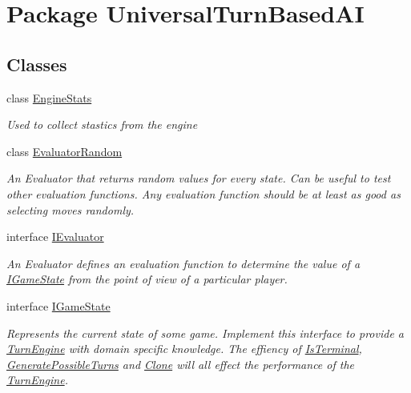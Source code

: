 \hypertarget{namespace_universal_turn_based_a_i}{}\section{Package Universal\+Turn\+Based\+A\+I}
\label{namespace_universal_turn_based_a_i}
\subsection*{Classes}
\begin{DoxyCompactItemize}
\item 
class \hyperlink{class_universal_turn_based_a_i_1_1_engine_stats}{Engine\+Stats}
\begin{DoxyCompactList}\small\item\em Used to collect stastics from the engine \end{DoxyCompactList}\item 
class \hyperlink{class_universal_turn_based_a_i_1_1_evaluator_random}{Evaluator\+Random}
\begin{DoxyCompactList}\small\item\em An Evaluator that returns random values for every state. Can be useful to test other evaluation functions. Any evaluation function should be at least as good as selecting moves randomly. \end{DoxyCompactList}\item 
interface \hyperlink{interface_universal_turn_based_a_i_1_1_i_evaluator}{I\+Evaluator}
\begin{DoxyCompactList}\small\item\em An Evaluator defines an evaluation function to determine the value of a \hyperlink{interface_universal_turn_based_a_i_1_1_i_game_state}{I\+Game\+State} from the point of view of a particular player. \end{DoxyCompactList}\item 
interface \hyperlink{interface_universal_turn_based_a_i_1_1_i_game_state}{I\+Game\+State}
\begin{DoxyCompactList}\small\item\em Represents the current state of some game. Implement this interface to provide a \hyperlink{class_universal_turn_based_a_i_1_1_turn_engine}{Turn\+Engine} with domain specific knowledge. The effiency of \hyperlink{interface_universal_turn_based_a_i_1_1_i_game_state_ac6c55bbcda732fbae17d4fa686258a57}{Is\+Terminal}, \hyperlink{interface_universal_turn_based_a_i_1_1_i_game_state_a1f0360d2154d764f124e1d83b67b21c4}{Generate\+Possible\+Turns} and \hyperlink{interface_universal_turn_based_a_i_1_1_i_game_state_a0a89b8e0ff0821f4715dcca7b612c6be}{Clone} will all effect the performance of the \hyperlink{class_universal_turn_based_a_i_1_1_turn_engine}{Turn\+Engine}. \end{DoxyCompactList}\item 

\end{DoxyCompactItemize}
